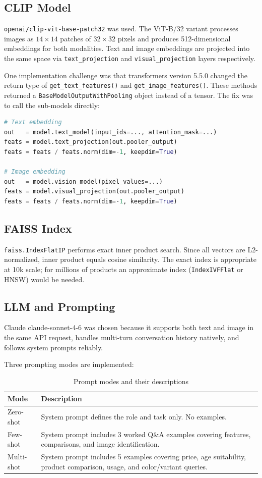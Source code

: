 \documentclass[11pt]{article}
\begin{document}
\subsection{CLIP Model}
\texttt{openai/clip-vit-base-patch32} was used. The ViT-B/32 variant processes images as
$14 \times 14$ patches of $32 \times 32$ pixels and produces 512-dimensional embeddings for
both modalities. Text and image embeddings are projected into the same space via
\texttt{text\_projection} and \texttt{visual\_projection} layers respectively.

One implementation challenge was that transformers version 5.5.0 changed the return type of
\texttt{get\_text\_features()} and \texttt{get\_image\_features()}. These methods returned a
\texttt{BaseModelOutputWithPooling} object instead of a tensor. The fix was to call the
sub-models directly:

\begin{lstlisting}[language=Python]
# Text embedding
out   = model.text_model(input_ids=..., attention_mask=...)
feats = model.text_projection(out.pooler_output)
feats = feats / feats.norm(dim=-1, keepdim=True)

# Image embedding
out   = model.vision_model(pixel_values=...)
feats = model.visual_projection(out.pooler_output)
feats = feats / feats.norm(dim=-1, keepdim=True)
\end{lstlisting}

\subsection{FAISS Index}
\texttt{faiss.IndexFlatIP} performs exact inner product search. Since all vectors are
L2-normalized, inner product equals cosine similarity. The exact index is appropriate at
10k scale; for millions of products an approximate index (\texttt{IndexIVFFlat} or HNSW)
would be needed.

\subsection{LLM and Prompting}
Claude claude-sonnet-4-6 was chosen because it supports both text and image in the same API
request, handles multi-turn conversation history natively, and follows system prompts reliably.

Three prompting modes are implemented:

\begin{table}[H]
\centering
\begin{tabular}{lp{9cm}}
\toprule
\textbf{Mode} & \textbf{Description} \\
\midrule
Zero-shot & System prompt defines the role and task only. No examples. \\
Few-shot  & System prompt includes 3 worked Q\&A examples covering features,
            comparisons, and image identification. \\
Multi-shot & System prompt includes 5 examples covering price, age suitability,
             product comparison, usage, and color/variant queries. \\
\bottomrule
\end{tabular}
\caption{Prompt modes and their descriptions}
\end{table}
\end{document}
